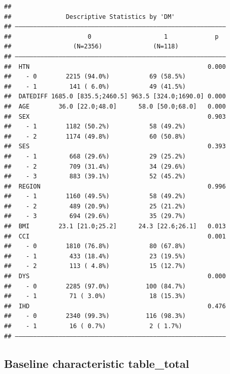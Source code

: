 \documentclass[
]{book}
\theoremstyle{definition}
\theoremstyle{definition}
\theoremstyle{definition}
\theoremstyle{definition}
\theoremstyle{remark}
\begin{document}
\begin{verbatim}
## 
##               Descriptive Statistics by 'DM'             
## —————————————————————————————————————————————————————————— 
##                     0                    1             p  
##                 (N=2356)              (N=118)       
## —————————————————————————————————————————————————————————— 
##  HTN                                                 0.000
##    - 0        2215 (94.0%)           69 (58.5%)           
##    - 1         141 ( 6.0%)           49 (41.5%)           
##  DATEDIFF 1685.0 [835.5;2460.5] 963.5 [324.0;1690.0] 0.000
##  AGE        36.0 [22.0;48.0]      58.0 [50.0;68.0]   0.000
##  SEX                                                 0.903
##    - 1        1182 (50.2%)           58 (49.2%)           
##    - 2        1174 (49.8%)           60 (50.8%)           
##  SES                                                 0.393
##    - 1         668 (29.6%)           29 (25.2%)           
##    - 2         709 (31.4%)           34 (29.6%)           
##    - 3         883 (39.1%)           52 (45.2%)           
##  REGION                                              0.996
##    - 1        1160 (49.5%)           58 (49.2%)           
##    - 2         489 (20.9%)           25 (21.2%)           
##    - 3         694 (29.6%)           35 (29.7%)           
##  BMI        23.1 [21.0;25.2]      24.3 [22.6;26.1]   0.013
##  CCI                                                 0.001
##    - 0        1810 (76.8%)           80 (67.8%)           
##    - 1         433 (18.4%)           23 (19.5%)           
##    - 2         113 ( 4.8%)           15 (12.7%)           
##  DYS                                                 0.000
##    - 0        2285 (97.0%)          100 (84.7%)           
##    - 1         71 ( 3.0%)            18 (15.3%)           
##  IHD                                                 0.476
##    - 0        2340 (99.3%)          116 (98.3%)           
##    - 1         16 ( 0.7%)            2 ( 1.7%)            
## ——————————————————————————————————————————————————————————
\end{verbatim}

\hypertarget{baseline-characteristic-table_total}{%
\subsection{Baseline characteristic table\_total}\label{baseline-characteristic-table_total}}
\end{document}
